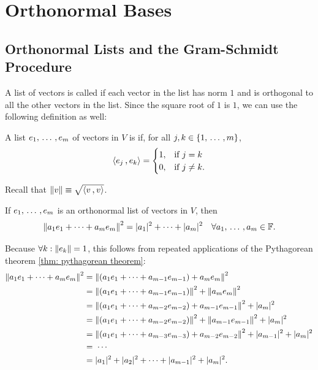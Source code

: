 \section{Orthonormal Bases}

\subsection{Orthonormal Lists and the Gram-Schmidt Procedure}
\begin{mydef}[orthonormal]
  A list of vectors is called  if each vector in the list has norm $1$ and is orthogonal to all the other vectors in the list. Since the square root of $1$ is $1$, we can use the following definition as well:

  A list $e_1, {\, \ldots \,\,}, e_m$ of vectors in $V$ is  if, for all $j,k \in \{1, {\, \ldots \,\,}, m\}$,
  \begin{equation}
    \ip{e_j}{e_k} = \begin{cases}
      1,  & \text{if $j=k$} \\
      0, & \text{if $j \neq k$}.
    \end{cases}
  \end{equation}

  Recall that $\norm{v} \equiv \sqrt{\ip{v}{v}}$.
\end{mydef}

\begin{thm}
  \label{thm: norm of an orthonormal linear combination}
  If $e_1, {\, \ldots \,\,}, e_m$ is an orthonormal list of vectors in $V$, then
  \begin{equation}
    \left \lVert a_1e_1 + \cdots+ a_m e_m \right \rVert ^2 = |a_1|^2 + \cdots + |a_m|^2 \quad \forall a_1, {\, \ldots \,\,}, a_m \in \mathbb{F}.
  \end{equation}
\end{thm}
\begin{prf}
  Because $\forall k: \left \lVert e_k \right \rVert=1$, this follows from repeated applications of the Pythagorean theorem \ref{thm: pythagorean theorem}:
  \begin{equation}
    \begin{aligned}
      \left \lVert a_1e_1 + \cdots+ a_m e_m \right \rVert ^2
      & = \left \lVert (a_1e_1 + \cdots + a_{m-1}e_{m-1}) + a_m e_m \right \rVert ^2 \\
      & = \left \lVert (a_1e_1 + \cdots + a_{m-1}e_{m-1}) \right \rVert^2 + \left \lVert a_m e_m \right \rVert ^2 \\
      & = \left \lVert (a_1e_1 + \cdots + a_{m-2}e_{m-2}) + a_{m-1}e_{m-1} \right \rVert^2 + |a_m|^2 \\
      & = \left \lVert (a_1e_1 + \cdots + a_{m-2}e_{m-2}) \right \rVert^2 + \left \lVert a_{m-1}e_{m-1} \right \rVert^2 + |a_m|^2\\
      & = \left \lVert (a_1e_1 + \cdots + a_{m-3}e_{m-3}) + a_{m-2}e_{m-2} \right \rVert^2 + |a_{m-1}|^2 + |a_m|^2\\
      & = \; \cdots \\
      & = |a_1|^2 + |a_2|^2 + \cdots + |a_{m-1}|^2 + |a_m|^2.
    \end{aligned}
  \end{equation}
  \vspace{-1em}
\end{prf}

